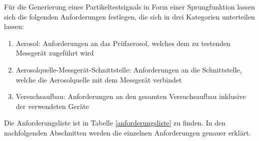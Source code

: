 F\"{u}r die Generierung eines Partikeltestsignals in Form einer Sprungfunktion lassen sich die folgenden Anforderungen festlegen, die sich in drei Kategorien unterteilen lassen:
\begin{enumerate}
	\item Aerosol: Anforderungen an das Pr\"{u}faerosol, welches dem zu testenden Messger\"{a}t zugef\"{u}hrt wird
	\item Aerosolquelle-Messger\"{a}t-Schnittstelle: Anforderungen an die Schnittstelle, welche die Aerosolquelle mit dem Messger\"{a}t verbindet
	\item Versuchsaufbau: Anforderungen an den gesamten Versuchsaufbau inklusive der verwendeten Ger\"{a}te
\end{enumerate}

Die Anforderungsliste ist in Tabelle \ref{anforderungsliste} zu finden. In den nachfolgenden Abschnitten werden die einzelnen Anforderungen genauer erkl\"{a}rt.

